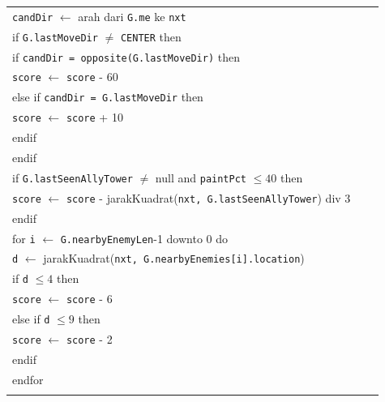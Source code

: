 \documentclass{article}
\newenvironment{pseudobox}
{
\centering
\begin{longtable}{|p{0.94\linewidth}|}
\hline
}
{
\\ \hline
\end{longtable}
\vspace{0.05cm}
}
\begin{document}
\begin{enumerate}[label=\alph*.]
\begin{enumerate}[label=\alph*.]
\begin{pseudobox}
\hspace*{1.5em}\texttt{candDir} $\leftarrow$ arah dari \texttt{G.me} ke \texttt{nxt} \\
\hspace*{1.5em}if \texttt{G.lastMoveDir} $\neq$ \texttt{CENTER} then \\
\hspace*{3em}if \texttt{candDir = opposite(G.lastMoveDir)} then \\
\hspace*{4.5em}\texttt{score} $\leftarrow$ \texttt{score} - 60 \\
\hspace*{3em}else if \texttt{candDir = G.lastMoveDir} then \\
\hspace*{4.5em}\texttt{score} $\leftarrow$ \texttt{score} + 10 \\
\hspace*{3em}endif \\
\hspace*{1.5em}endif \\

\hspace*{1.5em}if \texttt{G.lastSeenAllyTower} $\neq$ null and \texttt{paintPct} $\leq 40$ then \\
\hspace*{3em}\texttt{score} $\leftarrow$ \texttt{score} - jarakKuadrat(\texttt{nxt, G.lastSeenAllyTower}) div 3 \\
\hspace*{1.5em}endif \\

\hspace*{1.5em}for \texttt{i} $\leftarrow$ \texttt{G.nearbyEnemyLen}-1 downto 0 do \\
\hspace*{3em}\texttt{d} $\leftarrow$ jarakKuadrat(\texttt{nxt, G.nearbyEnemies[i].location}) \\
\hspace*{3em}if \texttt{d} $\leq 4$ then \\
\hspace*{4.5em}\texttt{score} $\leftarrow$ \texttt{score} - 6 \\
\hspace*{3em}else if \texttt{d} $\leq 9$ then \\
\hspace*{4.5em}\texttt{score} $\leftarrow$ \texttt{score} - 2 \\
\hspace*{3em}endif \\
\hspace*{1.5em}endfor \\


\end{pseudobox}
\end{enumerate}
\end{enumerate}
\end{document}
